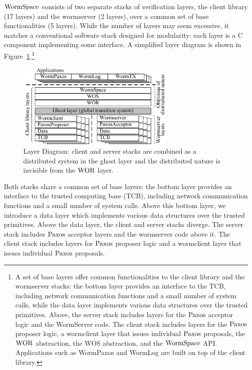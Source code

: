 $\mathrm{WormSpace}$ consists of two separate stacks of verification layers, the client library (17 layers) and the wormserver (2 layers), over a common set of base functionalities (5 layers). While the number of layers may seem excessive, it matches a conventional software stack designed for modularity: each layer is a C component implementing some interface. A simplified layer diagram is shown in Figure~\ref{fig:chapter:multipaxos:layerdiagram}.\footnote{
A set of base layers offer common functionalities to the client library and the wormserver stacks: 
the bottom layer provides an interface to the TCB, including network communication functions and a small number of system calls, 
while the data layer implements various data structures over the trusted primitives.
Above, the server stack includes layers for the $\mathrm{Paxos}$ acceptor logic and the WormServer code. 
The client stack includes layers for the $\mathrm{Paxos}$ proposer logic, a wormclient layer that issues individual $\mathrm{Paxos}$ proposals, 
the $\mathrm{WOR}$ abstraction, the WOS abstraction, and the $\mathrm{WormSpace}$ API.
Applications such as WormPaxos and WormLog are built on top of the client library.}
\begin{figure}
\centering
\includegraphics[width=0.7\textwidth]{figs/multipaxos/layer_diagram.pdf}
\caption{Layer Diagram: client and server stacks are combined as a distributed system in the ghost layer and the distributed nature is invisible from the $\mathrm{WOR}$ layer.}
\label{fig:chapter:multipaxos:layerdiagram}
\end{figure}
Both stacks share a common set of base layers: 
the bottom layer provides an interface to the trusted computing base (TCB), 
including network communication functions and a small number of system calls. Above this bottom layer, 
we introduce a data layer which implements various data structures over the trusted primitives. 
Above the data layer, the client and server stacks diverge. 
The server stack includes $\mathrm{Paxos}$ acceptor layers and the wormserver code above it.
The client stack includes layers for $\mathrm{Paxos}$ proposer logic and a wormclient layer that issues individual $\mathrm{Paxos}$ proposals.

